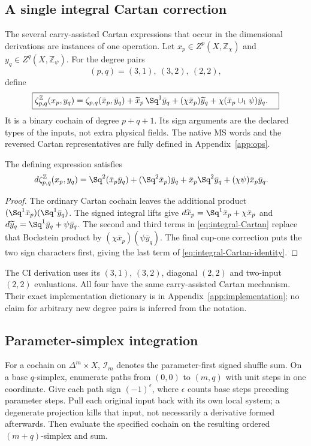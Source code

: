\subsection{A single integral Cartan correction}\label{subsec:integral-Cartan}
The several carry-assisted Cartan expressions that occur in the dimensional derivations are instances of one operation. Let $x_p\in Z^p(X,\mathbb Z_\chi)$ and $y_q\in Z^q(X,\mathbb Z_\psi)$. For the degree pairs
\[
 (p,q)=(3,1),\ (3,2),\ (2,2),
\]
define
\begin{equation}\label{eq:integral-Cartan}
 \boxed{\begin{aligned}
 \zeta^{\mathbb Z}_{p,q}(x_p,y_q)
 ={}&\zeta_{p,q}(\bar x_p,\bar y_q)
 +\widetilde x_p\,\Sq^1\bar y_q
 +(\chi\bar x_p)\widetilde y_q
 +\chi(\bar x_p\cup_1\psi)\bar y_q.
 \end{aligned}}
\end{equation}
It is a binary cochain of degree $p+q+1$. Its sign arguments are the declared types of the inputs, not extra physical fields. The native MS words and the reversed Cartan representatives are fully defined in Appendix~\ref{app:ops}.

The defining expression satisfies
\begin{equation}\label{eq:integral-Cartan-identity}
 \begin{aligned}
 d\zeta^{\mathbb Z}_{p,q}(x_p,y_q)
 ={}&\Sq^2(\bar x_p\bar y_q)
 +(\Sq^2\bar x_p)\bar y_q
 +\bar x_p\Sq^2\bar y_q
 +(\chi\psi)\bar x_p\bar y_q.
 \end{aligned}
\end{equation}
\begin{proof}
The ordinary Cartan cochain leaves the additional product
$(\Sq^1\bar x_p)(\Sq^1\bar y_q)$. The signed integral lifts give
$d\widetilde x_p=\Sq^1\bar x_p+\chi\bar x_p$ and
$d\widetilde y_q=\Sq^1\bar y_q+\psi\bar y_q$.
The second and third terms in \eqref{eq:integral-Cartan} replace that Bockstein product by
$(\chi\bar x_p)(\psi\bar y_q)$. The final cup-one correction puts the two sign characters first, giving the last term of \eqref{eq:integral-Cartan-identity}.
\end{proof}
The CI derivation uses its $(3,1)$, $(3,2)$, diagonal $(2,2)$ and two-input $(2,2)$ evaluations. All four have the same carry-assisted Cartan mechanism. Their exact implementation dictionary is in Appendix~\ref{app:implementation}; no claim for arbitrary new degree pairs is inferred from the notation.

\subsection{Parameter-simplex integration}\label{subsec:prism-rule}
For a cochain on $\Delta^m\times X$, $\mathcal I_m$ denotes the parameter-first signed shuffle sum. On a base $q$-simplex, enumerate paths from $(0,0)$ to $(m,q)$ with unit steps in one coordinate. Give each path sign $(-1)^\epsilon$, where $\epsilon$ counts base steps preceding parameter steps. Pull each original input back with its own local system; a degenerate projection kills that input, not necessarily a derivative formed afterwards. Then evaluate the specified cochain on the resulting ordered $(m+q)$-simplex and sum.


